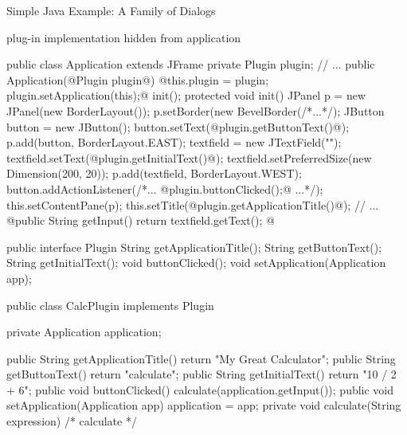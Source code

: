\begin{frame}[fragile]{Simple Java Example: A Family of Dialogs}
	\vspace{-2mm}
	\begin{fancycolumns}
		\begin{note}{}
			plug-in implementation hidden from application
		\end{note}
\begin{codetight}[basicstyle=\tiny]{}
public class Application extends JFrame {
	private Plugin plugin;
	// ...
	public Application(@Plugin plugin@) {
		@this.plugin = plugin;
		plugin.setApplication(this);@
		init();
	}
	protected void init() {
		JPanel p = new JPanel(new BorderLayout());
		p.setBorder(new BevelBorder(/*...*/);
		JButton button = new JButton();
		button.setText(@plugin.getButtonText()@);
		p.add(button, BorderLayout.EAST);
		textfield = new JTextField("");
		textfield.setText(@plugin.getInitialText()@);
		textfield.setPreferredSize(new Dimension(200, 20));
		p.add(textfield, BorderLayout.WEST);		
		button.addActionListener(/*... @plugin.buttonClicked();@ ...*/);
		this.setContentPane(p);		
		this.setTitle(@plugin.getApplicationTitle()@);
		// ...
	}
	@public String getInput() {
		return textfield.getText();
	}@
}
\end{codetight}
		\nextcolumn
{
\begin{codetight}[basicstyle=\tiny]{}
public interface Plugin {
	String getApplicationTitle();
	String getButtonText();
	String getInitialText();
	void buttonClicked();
	void setApplication(Application app);
}
\end{codetight}
\begin{codetight}[basicstyle=\tiny]{}
public class CalcPlugin implements Plugin {
	private Application application;

	public String getApplicationTitle() {
		return "My Great Calculator";
	}
	public String getButtonText() {
		return "calculate";
	}
	public String getInitialText() {
		return "10 / 2 + 6";
	}
	public void buttonClicked() {
		calculate(application.getInput());
	}
	public void setApplication(Application app) {
		application = app;
	}
	private void calculate(String expression) {
		/* calculate */
	}
}
\end{codetight}
}
	\end{fancycolumns}
\end{frame}

